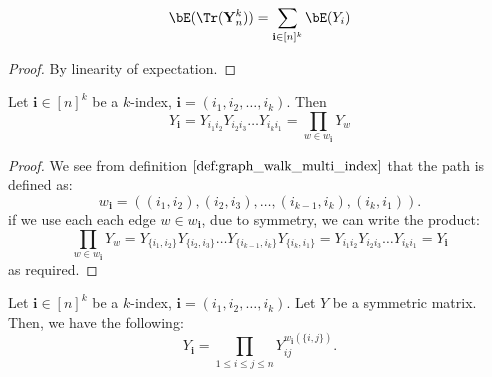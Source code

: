 \begin{lemma}
    \label{lem:trace_expectation_of_matrix}
    $$
    \bE(\Tr(\mathbf{Y}_{n}^{k})) = \sum_{\mathbf{i} \in [n]^{k}} \bE(Y_{i})
    $$
\end{lemma}

\begin{proof}
  By linearity of expectation.
\end{proof}


\begin{lemma}
    \label{lem:multi_index_graph_equivalence}
    Let $\mathbf{i} \in [n]^k$ be a $k$-index, $\mathbf{i}=\left(i_1, i_2, \ldots, i_k\right)$. Then
     $$
     Y_{\mathbf{i}} = Y_{i_{1}i_{2}} Y_{i_{2}i_{3}} \ldots Y_{i_{k}i_{1}} = \prod_{w \in w_{\mathbf{i}}} Y_{w}
    $$
\end{lemma}

\begin{proof}
    We see from definition $\ref{def:graph_walk_multi_index}$ that the path is defined as:
    $$
    w_{\mathbf{i}} = ((i_1, i_2),(i_2, i_3), \ldots,(i_{k-1}, i_k),(i_k, i_1)).
    $$
    if we use each each edge $w \in w_{\mathbf{i}}$, due to symmetry, we can write the product:
    $$
    \prod_{w\in w_{\mathbf{i}}} Y_{w} = Y_{\{i_{1}, i_{2}\}} Y_{\{i_{2}, i_{3}\}} \ldots Y_{\{i_{k-1}, i_{k}\}} Y_{\{i_{k}, i_{1}\}} = Y_{i_{1}i_{2}} Y_{i_{2}i_{3}} \ldots Y_{i_{k}i_{1}} = Y_{\mathbf{i}}
    $$
    as required.
\end{proof}


\begin{lemma}
    \label{lem:graph_walk_count_equivalence}
    Let $\mathbf{i} \in[n]^k$ be a $k$-index, $\mathbf{i}=\left(i_1, i_2, \ldots, i_k\right)$.
    Let $Y$ be a symmetric matrix. Then, we have the following:
    $$
    Y_{\mathbf{i}} =  \prod_{1 \leq i \leq j \leq n} Y_{ij}^{w_{\mathbf{i}}(\{i, j\})}.
    $$
\end{lemma}

